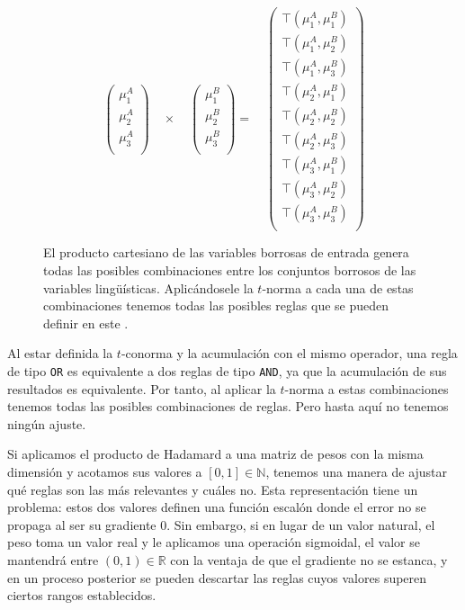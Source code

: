\begin{figure}
	\centering
	\begin{equation*}
	\left(\begin{array}{c}
	\mu_1^A \\
	\mu_2^A \\
	\mu_3^A \\
	\end{array}\right)
	\quad \times \quad
	\left(\begin{array}{ c}
	\mu_1^B \\
	\mu_2^B \\
	\mu_3^B \\
	\end{array}\right)
	= \quad 
	\left(\begin{array}{c}
	\top(\mu_1^A, \mu_1^B) \\
	\top(\mu_1^A, \mu_2^B) \\
	\top(\mu_1^A, \mu_3^B) \\
	\top(\mu_2^A, \mu_1^B) \\
	\top(\mu_2^A, \mu_2^B) \\
	\top(\mu_2^A, \mu_3^B) \\
	\top(\mu_3^A, \mu_1^B) \\
	\top(\mu_3^A, \mu_2^B) \\
	\top(\mu_3^A, \mu_3^B) \\
	\end{array}\right)
	\end{equation*}
	\caption[Producto cartesiano de variables borrosas de entrada]{El producto cartesiano de las variables borrosas de entrada genera todas las posibles combinaciones entre los conjuntos borrosos de las variables lingüísticas. Aplicándosele la $t$-norma a cada una de estas combinaciones tenemos todas las posibles reglas que se pueden definir en este .}
	\label{fig:inference-graph}
\end{figure}

Al estar definida la $t$-conorma y la acumulación con el mismo operador, una regla de tipo \texttt{OR} es equivalente a dos reglas de tipo \texttt{AND}, ya que la acumulación de sus resultados es equivalente. Por tanto, al aplicar la $t$-norma a estas combinaciones tenemos todas las posibles combinaciones de reglas. Pero hasta aquí no tenemos ningún ajuste.

Si aplicamos el producto de Hadamard a una matriz de pesos con la misma dimensión y acotamos sus valores a $[0, 1] \in \mathbb{N}$, tenemos una manera de ajustar qué reglas son las más relevantes y cuáles no. Esta representación tiene un problema: estos dos valores definen una función escalón donde el error no se propaga al ser su gradiente $0$. Sin embargo, si en lugar de un valor natural, el peso toma un valor real y le aplicamos una operación sigmoidal, el valor se mantendrá entre $(0, 1) \in \mathbb{R}$ con la ventaja de que el gradiente no se estanca, y en un proceso posterior se pueden descartar las reglas cuyos valores superen ciertos rangos establecidos.

